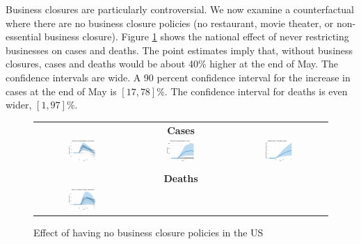 \documentclass[3p, longtitle]{elsarticle}
\theoremstyle{definition}
\begin{document}
Business closures are particularly controversial. We now examine a
counterfactual where there are no business closure policies (no
restaurant, movie theater, or non-essential business closure).  Figure
\ref{fig:US-business} shows the national effect of never restricting
businesses on cases and deaths. The point estimates imply that,
without business closures, cases and deaths would be about 40\% higher
at the end of May. The confidence intervals are wide. A 90 percent
confidence interval for the increase in cases at the end of May is
$[17,78]$\%.
The confidence interval for deaths is even wider, $[1, 97]$\%.


\begin{figure}[ht]
  \caption{Effect of having no business closure policies in the US\label{fig:US-business}}
  \begin{minipage}{\linewidth}
    \centering
    \begin{tabular}{ccc}
      \multicolumn{3}{c}{\textbf{Cases}} \\
      \includegraphics[width=0.31\textwidth]{tables_and_figures/us-index-dgrowth_idx}
      &
      \includegraphics[width=0.31\textwidth]{tables_and_figures/us-index-dcases_idx}
      &
        \includegraphics[width=0.31\textwidth]{tables_and_figures/us-index-rcumu_idx}
      \\
      \\
      \multicolumn{3}{c}{\textbf{Deaths}} \\
      \includegraphics[width=0.31\textwidth]{tables_and_figures/us-index-dgrowth_deaths_idx}

\end{tabular}
\end{minipage}
\end{figure}
\end{document}
